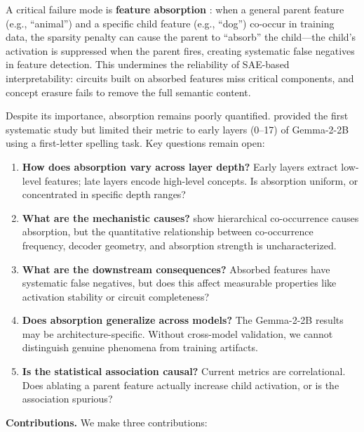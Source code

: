 \documentclass{article}
\begin{document}
A critical failure mode is \textbf{feature absorption} \cite{chanin2024absorption}: when a general parent feature (e.g., ``animal'') and a specific child feature (e.g., ``dog'') co-occur in training data, the sparsity penalty can cause the parent to ``absorb'' the child---the child's activation is suppressed when the parent fires, creating systematic false negatives in feature detection. This undermines the reliability of SAE-based interpretability: circuits built on absorbed features miss critical components, and concept erasure fails to remove the full semantic content.

Despite its importance, absorption remains poorly quantified. \cite{chanin2024absorption} provided the first systematic study but limited their metric to early layers (0--17) of Gemma-2-2B using a first-letter spelling task. Key questions remain open:

\begin{enumerate}
    \item \textbf{How does absorption vary across layer depth?} Early layers extract low-level features; late layers encode high-level concepts. Is absorption uniform, or concentrated in specific depth ranges?
    \item \textbf{What are the mechanistic causes?} \cite{chanin2024absorption} show hierarchical co-occurrence causes absorption, but the quantitative relationship between co-occurrence frequency, decoder geometry, and absorption strength is uncharacterized.
    \item \textbf{What are the downstream consequences?} Absorbed features have systematic false negatives, but does this affect measurable properties like activation stability or circuit completeness?
    \item \textbf{Does absorption generalize across models?} The Gemma-2-2B results may be architecture-specific. Without cross-model validation, we cannot distinguish genuine phenomena from training artifacts.
    \item \textbf{Is the statistical association causal?} Current metrics are correlational. Does ablating a parent feature actually increase child activation, or is the association spurious?
\end{enumerate}

\textbf{Contributions.} We make three contributions:
\end{document}
